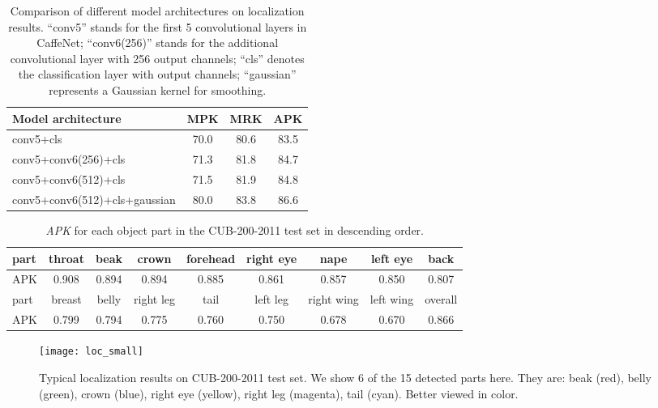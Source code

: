 \documentclass[10pt,twocolumn,letterpaper]{article}
\begin{document}
\begin{table}
\begin{center}
\small
\begin{tabular}{l|c|c|c}
\hline
Model architecture & MPK & MRK & APK \\
\hline
conv5+cls & 70.0 & 80.6 & 83.5 \\
conv5+conv6(256)+cls & 71.3 & 81.8 & 84.7 \\
conv5+conv6(512)+cls & 71.5 & 81.9 & 84.8 \\
conv5+conv6(512)+cls+gaussian & 80.0 & 83.8 & 86.6 \\
\hline
\end{tabular}
\end{center}
\caption{Comparison of different model architectures on localization results. ``conv5'' stands for the first 5 convolutional layers in CaffeNet; ``conv6(256)'' stands for the additional  convolutional layer with 256 output channels; ``cls'' denotes the classification layer with  output channels; ``gaussian'' represents a Gaussian kernel for smoothing.}
\label{tab:locarc}
\end{table}

\begin{table*}[ht]
\small
\begin{center}
\begin{tabular}{l|c|c|c|c|c|c|c|c}
\hline
part & throat & beak & crown & forehead & right eye & nape & left eye & back\\
\hline
APK & 0.908 & 0.894 & 0.894 & 0.885 & 0.861 & 0.857 & 0.850 & 0.807\\
\hline\hline
part & breast & belly & right leg & tail & left leg & right wing & left wing & overall\\
\hline
APK & 0.799 & 0.794 & 0.775 & 0.760 & 0.750 & 0.678 & 0.670 & 0.866\\
\hline
\end{tabular}
\end{center}
\caption{\emph{APK} for each object part in the CUB-200-2011 test set in descending order.}
\label{tab:locapk}
\end{table*}

\begin{figure*}[t]
\begin{center}
\texttt{[image: loc\_small]}
\end{center}
   \caption{Typical localization results on CUB-200-2011 test set. We show 6 of the 15 detected parts here. They are: beak (red), belly (green), crown (blue), right eye (yellow), right leg (magenta), tail (cyan). Better viewed in color.}
\label{fig:loc}
\end{figure*}
\end{document}
